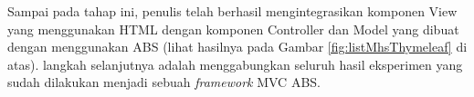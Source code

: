 Sampai pada tahap ini, penulis telah berhasil mengintegrasikan komponen View yang menggunakan HTML dengan komponen Controller dan Model yang dibuat dengan menggunakan ABS (lihat hasilnya pada Gambar \ref{fig:listMhsThymeleaf} di atas). langkah selanjutnya adalah menggabungkan seluruh hasil eksperimen yang sudah dilakukan menjadi sebuah \textit{framework} MVC ABS.